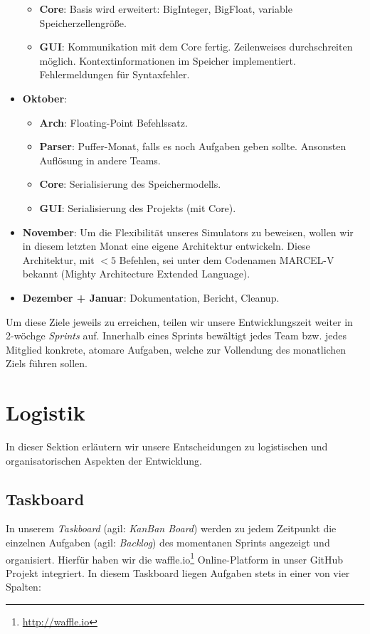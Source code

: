 \begin{itemize}
\begin{itemize}
      \item \textbf{Core}: Basis wird erweitert: BigInteger, BigFloat, variable Speicherzellengröße.
      \item \textbf{GUI}: Kommunikation mit dem Core fertig. Zeilenweises
        durchschreiten möglich. Kontextinformationen im Speicher
        implementiert. Fehlermeldungen für Syntaxfehler.
    \end{itemize}
  \item \textbf{Oktober}:
    \begin{itemize}
      \item \textbf{Arch}: Floating-Point Befehlssatz.
      \item \textbf{Parser}: Puffer-Monat, falls es noch Aufgaben geben
        sollte. Ansonsten Auflösung in andere Teams.
      \item \textbf{Core}: Serialisierung des Speichermodells.
      \item \textbf{GUI}: Serialisierung des Projekts (mit Core).
    \end{itemize}
  \item \textbf{November}: Um die Flexibilität unseres Simulators zu beweisen,
    wollen wir in diesem letzten Monat eine eigene Architektur entwickeln. Diese
    Architektur, mit $< 5$ Befehlen, sei unter dem Codenamen MARCEL-V bekannt
    (Mighty Architecture Extended Language).
  \item \textbf{Dezember + Januar}: Dokumentation, Bericht, Cleanup.
\end{itemize}


Um diese Ziele jeweils zu erreichen, teilen wir unsere Entwicklungszeit weiter
in 2-wöchge \emph{Sprints} auf. Innerhalb eines Sprints bewältigt jedes Team
bzw. jedes Mitglied konkrete, atomare Aufgaben, welche zur Vollendung des
monatlichen Ziels führen sollen.

\section{Logistik}

In dieser Sektion erläutern wir unsere Entscheidungen zu logistischen und
organisatorischen Aspekten der Entwicklung.

\subsection{Taskboard}

In unserem \emph{Taskboard} (agil: \emph{KanBan Board}) werden zu jedem
Zeitpunkt die einzelnen Aufgaben (agil: \emph{Backlog}) des momentanen Sprints
angezeigt und organisiert. Hierfür haben wir die
waffle.io\footnote{\url{http://waffle.io}} Online-Platform in unser GitHub
Projekt integriert. In diesem Taskboard liegen Aufgaben stets in einer von vier
Spalten:

